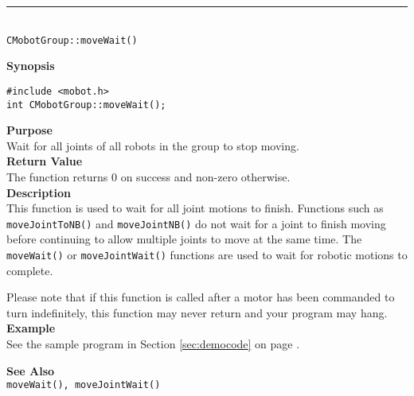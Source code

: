 \noindent
\vspace{5pt}
\rule{4.5in}{0.015in}\\
\noindent
{\LARGE \texttt{CMobotGroup::moveWait()}}\\
{}

\noindent
{\bf Synopsis}
\begin{verbatim}
#include <mobot.h>
int CMobotGroup::moveWait();
\end{verbatim}

\noindent
{\bf Purpose}\\
Wait for all joints of all robots in the group to stop moving.\\

\noindent
{\bf Return Value}\\
The function returns 0 on success and non-zero otherwise.\\

\noindent
{\bf Description}\\
This function is used to wait for all joint motions to finish. Functions such as
\texttt{moveJointToNB()} and \texttt{moveJointNB()} do not wait for a joint to finish
moving before continuing to allow multiple joints to move at the same time. The
\texttt{moveWait()} or \texttt{moveJointWait()} functions are used to wait for
robotic motions to complete.

Please note that if this function is called after a motor has been commanded to
turn indefinitely, this function may never return and your program may hang.\\

\noindent
{\bf Example}\\
See the sample program in Section \ref{sec:democode} on page \pageref{sec:democode}.
\noindent

\noindent
{\bf See Also}\\
\texttt{moveWait(), moveJointWait()}

